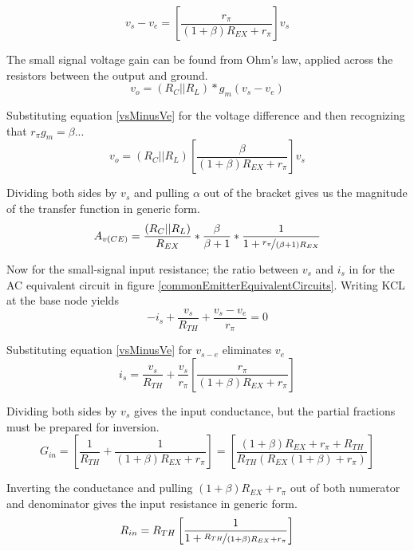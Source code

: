 \documentclass[titlepage, letterpaper, 11pt]{article}
\begin{document}
\begin{equation}
v_{s}-v_{e}=
\left[\frac{r_{\pi}}{(1+\beta)R_{EX}+r_{\pi}}\right]v_{s}
\label{vsMinusVe}
\end{equation}

The small signal voltage gain can be found from Ohm's law, applied
across the resistors between the output and ground.
\begin{equation*}
v_{o}=(R_{C}||R_{L})*g_{m}(v_{s}-v_{e})
\end{equation*}

Substituting equation \ref{vsMinusVe} for the voltage difference and
then recognizing that $r_{\pi}g_{m}=\beta$...
\begin{equation*}
v_{o}=(R_{C}||R_{L})
\left[\frac{\beta}{(1+\beta)R_{EX}+r_{\pi}}\right]v_{s}
\end{equation*}

Dividing both sides by $v_{s}$ and pulling $\alpha$ out of the
bracket gives us the magnitude of the transfer function in generic
form.
\begin{equation}
A_{v(CE)}=\frac{(R_{C}||R_{L})}{R_{EX}}*\frac{\beta}{\beta+1}*
\frac{1}{1+\nicefrac{r_{\pi}}{(\beta+1)R_{EX}}}
\label{ceAv}
\end{equation}

Now for the small-signal input resistance; the ratio between
$v_{s}$ and $i_{s}$ in for the AC equivalent circuit in figure
\ref{commonEmitterEquivalentCircuits}. Writing KCL at the base node
yields
\begin{equation*}
-i_{s}+\frac{v_{s}}{R_{TH}}+\frac{v_{s}-v_{e}}{r_{\pi}}=0
\end{equation*}

Substituting equation \ref{vsMinusVe} for $v_{s-e}$ 
eliminates $v_{e}$
\begin{equation*}
i_{s}=\frac{v_{s}}{R_{TH}}+\frac{v_{s}}{r_{\pi}}
\left[\frac{r_{\pi}}{(1+\beta)R_{EX}+r_{\pi}}\right]
\end{equation*}

Dividing both sides by $v_{s}$ gives the input conductance,
but the partial fractions must be prepared for inversion.
\begin{equation*}
G_{in}=
\left[\frac{1}{R_{TH}}+\frac{1}{(1+\beta)R_{EX}+r_{\pi}}\right]=
\left[\frac{(1+\beta)R_{EX}+r_{\pi}+R_{TH}}
{R_{TH}(R_{EX}(1+\beta)+r_{\pi})}\right]
\end{equation*}

Inverting the conductance and pulling
$(1+\beta)R_{EX}+r_{\pi}$ out of both numerator and denominator gives
the input resistance in generic form.
\begin{equation*}
R_{in}=R_{TH}
\left[\frac{1}{1+\nicefrac{R_{TH}}{(1+\beta)R_{EX}+r_{\pi}}}\right]
\end{equation*}
\end{document}
